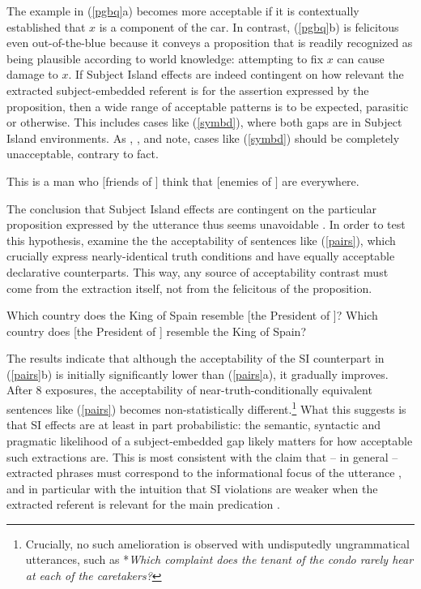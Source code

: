 \documentclass[output=paper]{langsci/langscibook}
\begin{document}

\noindent
The example in  (\ref{pgbq}a)  becomes more acceptable if it is contextually  established that $x$ is  a component of the car. In contrast, (\ref{pgbq}b) is felicitous even out-of-the-blue because it  conveys a  proposition  that is  readily recognized as being plausible according to world knowledge: attempting to fix $x$ can cause  damage to $x$.  If Subject Island effects are indeed contingent on how relevant the extracted subject-embedded referent is for the assertion expressed by the proposition, then a wide range of acceptable  patterns is to be expected, parasitic or otherwise. This includes cases like  (\ref{symbd}), where both gaps are in Subject Island environments. As \citet{Levine:Sag:03}, \citet[256]{levhubook},  and \citet[161]{Culicover13} note, cases like (\ref{symbd}) should be completely unacceptable, contrary to fact.


\ea
 This is a man who $[$friends of \spcs $]$
 think that $[$enemies of \spcs $]$ are everywhere.
 \z \label{symbd}

The conclusion that Subject Island effects are contingent on the particular proposition expressed by the utterance thus seems unavoidable \citep{chavesresp}. In order to test this hypothesis, \citet{chavesresp} examine the 
the acceptability of sentences like (\ref{pairs}), which crucially  express nearly-identical truth conditions and have equally acceptable declarative counterparts. This way, any source of acceptability contrast must come from the extraction itself, not from the felicitous of the proposition. 

\ea 
\ea Which country does the King of  Spain resemble [the President of \spcs]?
\ex Which country does [the President of \spcs] resemble  the King of Spain?
\z \label{pairs}
\z

\noindent
The results indicate that although the acceptability of the SI counterpart in (\ref{pairs}b)
is initially significantly lower than (\ref{pairs}a), it gradually improves.
After 8 exposures, the acceptability of near-truth-conditionally equivalent sentences like (\ref{pairs}) becomes non-statistically different.\footnote{Crucially, no such amelioration is observed with undisputedly ungrammatical
utterances, such as *{\it Which complaint does the tenant of the condo rarely hear at each of the caretakers?}}
What this suggests is that SI effects are at least in part probabilistic: the semantic, syntactic and pragmatic
likelihood of a subject-embedded gap likely matters for how acceptable such extractions are. This is 
most consistent with the claim that -- in general -- extracted phrases must correspond to the informational focus
of the utterance  \citep{shir-jrn,valin86,kuno87,ken,Dean,goldberg13}, and in particular with the intuition that
SI violations are weaker when the extracted referent is relevant for the main predication \citep[495]{kluender06}.
\end{document}
